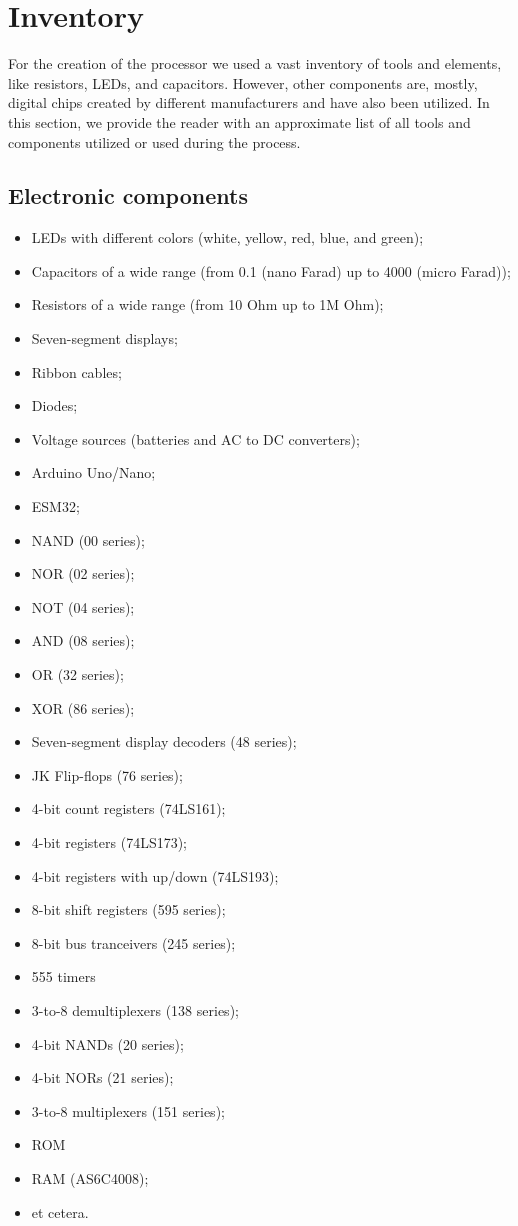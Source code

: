 \section{Inventory} \label{sec:inventory}
For the creation of the processor we used a vast inventory of tools and elements, like resistors, LEDs, and capacitors. However, other components are, mostly, digital chips created by different manufacturers and have also been utilized. In this section, we provide the reader with an approximate list of all tools and components utilized or used during the process.

\subsection{Electronic components}
\begin{itemize}
	\item LEDs with different colors (white, yellow, red, blue, and green);
	\item Capacitors of a wide range (from 0.1 (nano Farad) up to 4000 (micro Farad));
	\item Resistors of a wide range (from 10 Ohm up to 1M Ohm);
	\item Seven-segment displays;
	\item Ribbon cables;
	\item Diodes;
	\item Voltage sources (batteries and AC to DC converters);
	\item Arduino Uno/Nano;
	\item ESM32;
	\item NAND (00 series);
	\item NOR (02 series);
	\item NOT (04 series);
	\item AND (08 series);
	\item OR (32 series);
	\item XOR (86 series);
	\item Seven-segment display decoders (48 series);
	\item JK Flip-flops (76 series);
	\item 4-bit count registers (74LS161);
	\item 4-bit registers (74LS173);
	\item 4-bit registers with up/down (74LS193);
	\item 8-bit shift registers (595 series);
	\item 8-bit bus tranceivers (245 series);
	\item 555 timers
	\item 3-to-8 demultiplexers (138 series);
	\item 4-bit NANDs (20 series);
	\item 4-bit NORs (21 series);
	\item 3-to-8 multiplexers (151 series);
	\item ROM 
	\item RAM (AS6C4008);
	\item et cetera. 
\end{itemize}

